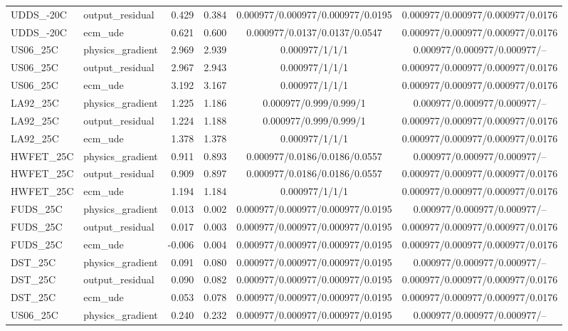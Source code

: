 \begin{table}[!t]
\begin{tabular}{llrrcc}
UDDS\_-20C & output\_residual & 0.429 & 0.384 & 0.000977/0.000977/0.000977/0.0195 & 0.000977/0.000977/0.000977/0.0176 \\
UDDS\_-20C & ecm\_ude & 0.621 & 0.600 & 0.000977/0.0137/0.0137/0.0547 & 0.000977/0.000977/0.000977/0.0176 \\
US06\_25C & physics\_gradient & 2.969 & 2.939 & 0.000977/1/1/1 & 0.000977/0.000977/0.000977/-- \\
US06\_25C & output\_residual & 2.967 & 2.943 & 0.000977/1/1/1 & 0.000977/0.000977/0.000977/0.0176 \\
US06\_25C & ecm\_ude & 3.192 & 3.167 & 0.000977/1/1/1 & 0.000977/0.000977/0.000977/0.0176 \\
LA92\_25C & physics\_gradient & 1.225 & 1.186 & 0.000977/0.999/0.999/1 & 0.000977/0.000977/0.000977/-- \\
LA92\_25C & output\_residual & 1.224 & 1.188 & 0.000977/0.999/0.999/1 & 0.000977/0.000977/0.000977/0.0176 \\
LA92\_25C & ecm\_ude & 1.378 & 1.378 & 0.000977/1/1/1 & 0.000977/0.000977/0.000977/0.0176 \\
HWFET\_25C & physics\_gradient & 0.911 & 0.893 & 0.000977/0.0186/0.0186/0.0557 & 0.000977/0.000977/0.000977/-- \\
HWFET\_25C & output\_residual & 0.909 & 0.897 & 0.000977/0.0186/0.0186/0.0557 & 0.000977/0.000977/0.000977/0.0176 \\
HWFET\_25C & ecm\_ude & 1.194 & 1.184 & 0.000977/1/1/1 & 0.000977/0.000977/0.000977/0.0176 \\
FUDS\_25C & physics\_gradient & 0.013 & 0.002 & 0.000977/0.000977/0.000977/0.0195 & 0.000977/0.000977/0.000977/-- \\
FUDS\_25C & output\_residual & 0.017 & 0.003 & 0.000977/0.000977/0.000977/0.0195 & 0.000977/0.000977/0.000977/0.0176 \\
FUDS\_25C & ecm\_ude & -0.006 & 0.004 & 0.000977/0.000977/0.000977/0.0195 & 0.000977/0.000977/0.000977/0.0176 \\
DST\_25C & physics\_gradient & 0.091 & 0.080 & 0.000977/0.000977/0.000977/0.0195 & 0.000977/0.000977/0.000977/-- \\
DST\_25C & output\_residual & 0.090 & 0.082 & 0.000977/0.000977/0.000977/0.0195 & 0.000977/0.000977/0.000977/0.0176 \\
DST\_25C & ecm\_ude & 0.053 & 0.078 & 0.000977/0.000977/0.000977/0.0195 & 0.000977/0.000977/0.000977/0.0176 \\
US06\_25C & physics\_gradient & 0.240 & 0.232 & 0.000977/0.000977/0.000977/0.0195 & 0.000977/0.000977/0.000977/-- \\

\end{tabular}
\end{table}
